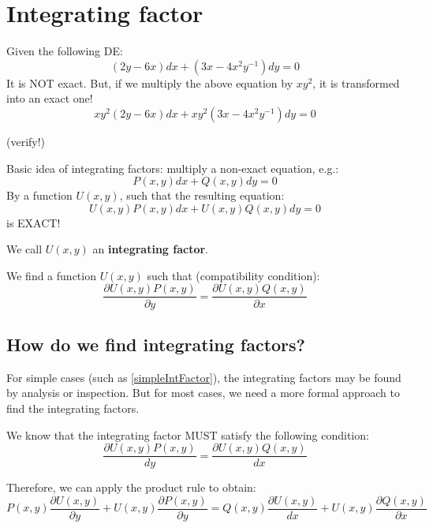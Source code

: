 \section{Integrating factor}
\begin{exmp}{}
Given the following DE:
\begin{equation}
\left(2y-6x\right)dx +\left(3x-4x^2y^{-1}\right)dy=0
\end{equation}
It is NOT exact. But, if we multiply the above equation by $xy^2$, it is transformed into an exact one!
\begin{equation}
xy^2\left(2y-6x\right)dx +xy^2\left(3x-4x^2y^{-1}\right)dy=0
\end{equation}
\label{simpleIntFactor}
\end{exmp}
(verify!)




Basic idea of integrating factors:  multiply a non-exact equation, e.g.:
\begin{equation}
P(x,y)dx+Q(x,y)dy=0
\end{equation}
By a function $U(x,y)$, such that the resulting equation:
\begin{equation}
U(x,y)P(x,y)dx+U(x,y)Q(x,y)dy=0
\end{equation}
is EXACT! 

We call $U(x,y)$ an \textbf{integrating factor}.

We find a function $U(x,y)$ such that (compatibility condition):
\begin{equation}
\frac{\partial U(x,y)P(x,y)}{\partial y}=\frac{\partial U(x,y)Q(x,y)}{\partial x}
\end{equation}



\subsection{How do we find integrating factors?}
For simple cases (such as \ref{simpleIntFactor}), the integrating factors may be found by analysis or inspection. But for most cases, we need a more formal approach to find the integrating factors.


We know that the integrating factor MUST satisfy the following condition:
\begin{equation}
\frac{\partial U(x,y)P(x,y)}{dy}=\frac{\partial U(x,y)Q(x,y)}{dx}
\label{chainrule}
\end{equation}

Therefore, we can apply the product rule to obtain:
\begin{equation}
P(x,y)\frac{\partial U(x,y)}{\partial y}+U(x,y)\frac{\partial P(x,y)}{\partial y}=Q(x,y)\frac{\partial U(x,y)}{dx}+U(x,y)\frac{\partial Q(x,y)}{\partial x}
\end{equation}

